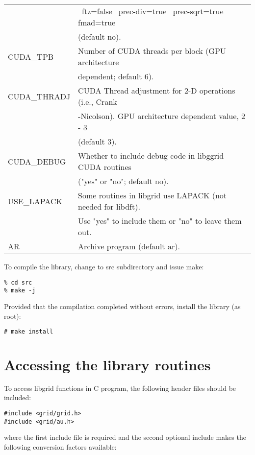 \documentclass[12pt,letterpaper]{article}
\begin{document}
\begin{tabular}{ll}
               & --ftz=false --prec-div=true --prec-sqrt=true --fmad=true\\
               & (default no).\\
CUDA\_TPB & Number of CUDA threads per block (GPU architecture\\
          & dependent; default 6).\\
CUDA\_THRADJ & CUDA Thread adjustment for 2-D operations (i.e., Crank\\
             & -Nicolson). GPU architecture dependent value, 2 - 3\\
             & (default 3).\\
CUDA\_DEBUG & Whether to include debug code in libggrid CUDA routines\\
            & ("yes" or "no"; default no).\\
USE\_LAPACK & Some routines in libgrid use LAPACK (not needed for libdft).\\
            & Use "yes" to include them or "no" to leave them out.\\
AR & Archive program (default ar).\\
\end{tabular}
To compile the library, change to src subdirectory and issue make:
\begin{verbatim}
% cd src
% make -j
\end{verbatim}
Provided that the compilation completed without errors, install the library (as root):
\begin{verbatim}
# make install
\end{verbatim}

\section{Accessing the library routines}

To access libgrid functions in C program, the following header files should be included:
\begin{verbatim}
#include <grid/grid.h>
#include <grid/au.h>
\end{verbatim}
where the first include file is required and the second optional include makes the following conversion factors available:\\
\end{document}
